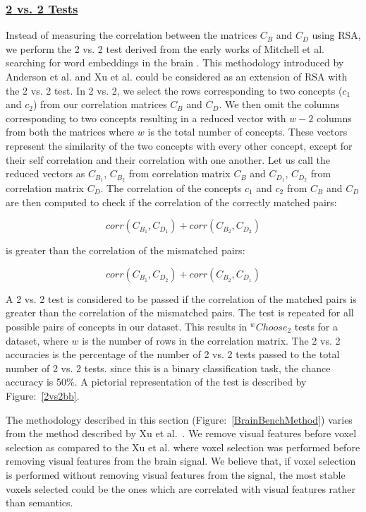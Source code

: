 \subsubsection{\underline{2 vs. 2 Tests}}
Instead of measuring the correlation between the matrices $C_B$ and  $C_D$ using RSA, we perform the 2 vs. 2 test derived from the early works of Mitchell et al. searching for word embeddings in the brain \cite{Mitchell1191}. This methodology introduced by  Anderson et al. \cite{Andrew2vs2} and Xu et al. \cite{BrainBench2016} could be considered as an extension of RSA with the 2 vs. 2 test. In 2 vs. 2, we select the rows corresponding to two concepts ($c_1$ and $c_2$) from our correlation matrices $C_B$ and  $C_D$. We then omit the columns corresponding to two concepts resulting in a reduced vector with $w-2$ columns from both the matrices where $w$ is the total number of concepts. These vectors represent the similarity of the two concepts with every other concept, except for their self correlation and their correlation with one another. Let us call the reduced vectors as
$C_{B_1}$, $C_{B_2}$ from correlation matrix $C_B$ and $C_{D_1}$, $C_{D_2}$ from correlation matrix $C_D$. The correlation of the concepts $c_1$ and $c_2$ from $C_B$ and  $C_D$  are then computed to check if the correlation of the correctly matched pairs:

\[corr(C_{B_1},C_{D_1}) + corr(C_{B_2},C_{D_2})  \]

\noindent is greater than the correlation of the mismatched pairs:

\[corr(C_{B_1},C_{D_2}) + corr(C_{B_2},C_{D_1})  \]

A 2 vs. 2 test is considered to be passed if the correlation of the matched pairs is greater than the correlation of the mismatched pairs. The test is repeated for all possible pairs of concepts in our dataset. This results in $^wChoose_2$ tests for a dataset, where $w$ is the number of rows in the correlation matrix. The 2 vs. 2 accuracies is the percentage of the number of 2 vs. 2 tests passed to the total number of 2 vs. 2 tests. since this is a binary classification task, the chance accuracy is 50\%. A pictorial representation of the test is described by Figure:~\ref{2vs2bb}.


The methodology described in this section (Figure:~\ref{BrainBenchMethod}) varies from the method described by Xu et al.~\cite{BrainBench2016}.  We remove visual features before voxel selection as compared to the Xu et al. where voxel selection was performed before removing visual features from the brain signal.  We believe that, if voxel selection is performed without removing visual features from the signal, the most stable voxels selected could be the ones which are correlated with visual features rather than semantics.


